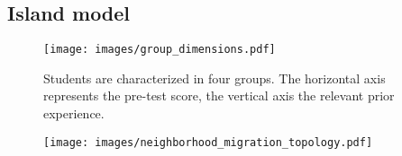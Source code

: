 \subsection{Island model}
\begin{figure}[ht!]
	\centering
	\texttt{[image: images/group\_dimensions.pdf]}
	\caption[Group characterization]{Students are characterized in four groups.
		The horizontal axis represents the pre-test score, the vertical axis
		the relevant prior experience.}
	\label{fig:group_dimensions}
\end{figure}
\begin{figure}[ht!]
	\centering
	\texttt{[image: images/neighborhood\_migration\_topology.pdf]}
	\caption[Neighborhood Migration Topology]{}
	\label{fig:migration_topology}
\end{figure}
